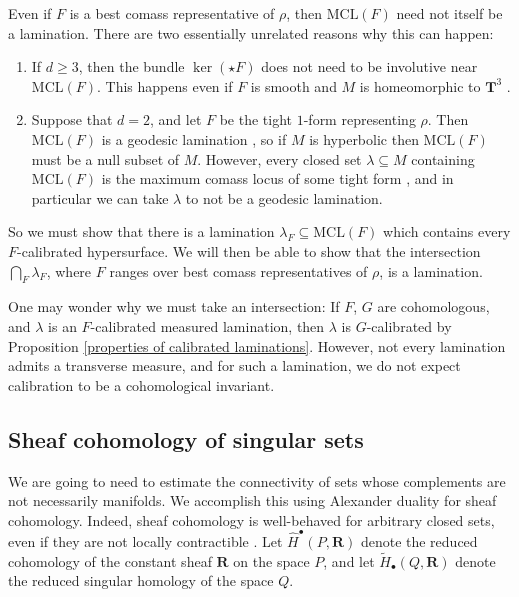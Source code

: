 \documentclass[reqno,11pt]{amsart}
\newcommand{\RR}{\mathbf{R}}
\newcommand{\MCL}{\mathrm{MCL}}
\theoremstyle{definition}
\numberwithin{equation}{section}
\begin{document}
Even if $F$ is a best comass representative of $\rho$, then $\MCL(F)$ need not itself be a lamination.
There are two essentially unrelated reasons why this can happen:
\begin{enumerate}
\item If $d \geq 3$, then the bundle $\ker(\star F)$ does not need to be involutive near $\MCL(F)$.
This happens even if $F$ is smooth and $M$ is homeomorphic to $\mathbf T^3$ \cite[Example 5.4]{bangert_cui_2017}.
\item Suppose that $d = 2$, and let $F$ be the tight $1$-form representing $\rho$. Then $\MCL(F)$ is a geodesic lamination \cite[Theorem 5.2]{daskalopoulos2020transverse}, so if $M$ is hyperbolic then $\MCL(F)$ must be a null subset of $M$.
However, every closed set $\lambda \subseteq M$ containing $\MCL(F)$ is the maximum comass locus of some tight form \cite{BackusZeAn}, and in particular we can take $\lambda$ to not be a geodesic lamination.
\end{enumerate}
So we must show that there is a lamination $\lambda_F \subseteq \MCL(F)$ which contains every $F$-calibrated hypersurface.
We will then be able to show that the intersection $\bigcap_F \lambda_F$, where $F$ ranges over best comass representatives of $\rho$, is a lamination.

One may wonder why we must take an intersection:
If $F$, $G$ are cohomologous, and $\lambda$ is an $F$-calibrated measured lamination, then $\lambda$ is $G$-calibrated by Proposition \ref{properties of calibrated laminations}.
However, not every lamination admits a transverse measure, and for such a lamination, we do not expect calibration to be a cohomological invariant.

\subsection{Sheaf cohomology of singular sets}
We are going to need to estimate the connectivity of sets whose complements are not necessarily manifolds.
We accomplish this using Alexander duality for sheaf cohomology.
Indeed, sheaf cohomology is well-behaved for arbitrary closed sets, even if they are not locally contractible \cite{Kaplan47}.
Let $\hat H^\bullet(P, \RR)$ denote the reduced cohomology of the constant sheaf $\RR$ on the space $P$, and let $\tilde H_\bullet(Q, \RR)$ denote the reduced singular homology of the space $Q$.
\end{document}

